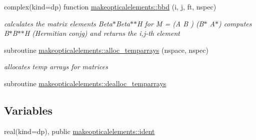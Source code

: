\begin{DoxyCompactItemize}
complex(kind=dp) function \hyperlink{namespacemakeopticalelements_a7d0e54a1c7f830fd961f3c99d0a49b30}{makeopticalelements\+::bbd} (i, j, ft, nspec)
\begin{DoxyCompactList}\small\item\em calculates the matrix elements Beta$\ast$\+Beta$\ast$$\ast$H  for M = (A B ) (B$\ast$ A$\ast$) computes B$\ast$\+B$\ast$$\ast$H (Hermitian conjg) and returns the i,j-\/th element \end{DoxyCompactList}\item 
subroutine \hyperlink{namespacemakeopticalelements_aefda61530c80eccf75e7065015af413d}{makeopticalelements\+::alloc\+\_\+temparrays} (nspace, nspec)
\begin{DoxyCompactList}\small\item\em allocates temp arrays for matrices \end{DoxyCompactList}\item 
subroutine \hyperlink{namespacemakeopticalelements_aab212aad9e53b7ae643456f9bc0b68cb}{makeopticalelements\+::dealloc\+\_\+temparrays}
\end{DoxyCompactItemize}
\subsection*{Variables}
\begin{DoxyCompactItemize}
\item 
real(kind=dp), public \hyperlink{namespacemakeopticalelements_ab4e48a98a0fb0756bb4eff6ece9623a8}{makeopticalelements\+::ident}
\end{DoxyCompactItemize}
